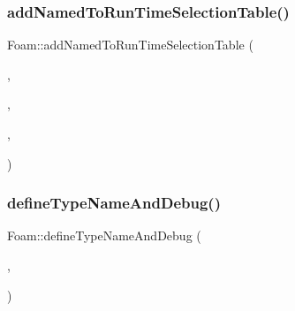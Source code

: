 \mbox{\label{namespaceFoam_a84d7b7dae4ca14dd2ac0f6db58cf13a0}} 
\subsubsection{\texorpdfstring{add\+Named\+To\+Run\+Time\+Selection\+Table()}{addNamedToRunTimeSelectionTable()}\hspace{0.1cm}{\footnotesize\ttfamily [19/19]}}
{\footnotesize\ttfamily Foam\+::add\+Named\+To\+Run\+Time\+Selection\+Table (\begin{DoxyParamCaption}\item[{\hyperlink{classFoam_1_1FSHeatTransferCoefficientModel}{F\+S\+Heat\+Transfer\+Coefficient\+Model}}]{,  }\item[{\hyperlink{namespaceFoam_a1a8374d33d29cd2e004e8a98ac1f3d32}{constant\+F\+S\+Heat\+Transfer\+Coefficient}}]{,  }\item[{F\+S\+Heat\+Transfer\+Coefficient\+Models}]{,  }\item[{\hyperlink{classFoam_1_1constant}{constant}}]{ }\end{DoxyParamCaption})}

\mbox{\label{namespaceFoam_a0afee0d6290a4d5400351deea11ea781}} 
\subsubsection{\texorpdfstring{define\+Type\+Name\+And\+Debug()}{defineTypeNameAndDebug()}\hspace{0.1cm}{\footnotesize\ttfamily [41/50]}}
{\footnotesize\ttfamily Foam\+::define\+Type\+Name\+And\+Debug (\begin{DoxyParamCaption}\item[{\hyperlink{classFoam_1_1virtualMass}{virtual\+Mass}}]{,  }\item[{0}]{ }\end{DoxyParamCaption})}

\mbox{\label{namespaceFoam_a34564e19d9cafc7d63540aa6e27ef7de}} 
